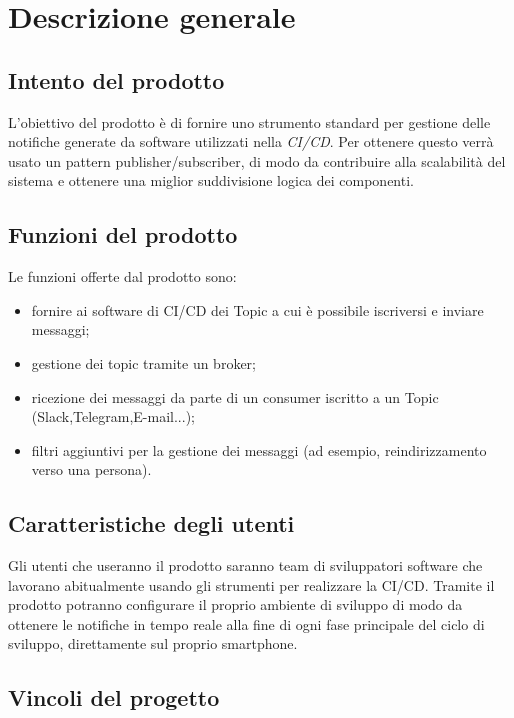\section{Descrizione generale}

	\subsection{Intento del prodotto}
    
    L'obiettivo del prodotto è di fornire uno strumento standard per gestione delle notifiche generate da software utilizzati nella \textit{CI/CD}\GAlt.
    Per ottenere questo verrà usato un pattern publisher/subscriber, di modo da contribuire alla scalabilità del sistema e ottenere una miglior suddivisione logica dei componenti.
	
	\subsection{Funzioni del prodotto}
	
    Le funzioni offerte dal prodotto sono:
    \begin{itemize}
		\item fornire ai software di CI/CD dei Topic a cui è possibile iscriversi e inviare messaggi;
		\item gestione dei topic tramite un broker;
        \item ricezione dei messaggi da parte di un consumer iscritto a un Topic (Slack,Telegram,E-mail...);
        \item filtri aggiuntivi per la gestione dei messaggi (ad esempio, reindirizzamento verso una persona).
	\end{itemize}

	\subsection{Caratteristiche degli utenti}
    
    Gli utenti che useranno il prodotto saranno team di sviluppatori software che lavorano abitualmente usando gli strumenti per realizzare la CI/CD.
    Tramite il prodotto potranno configurare il proprio ambiente di sviluppo di modo da ottenere le notifiche in tempo reale alla fine di ogni fase principale del ciclo di sviluppo, direttamente sul proprio smartphone.
	
	\subsection{Vincoli del progetto}
	
